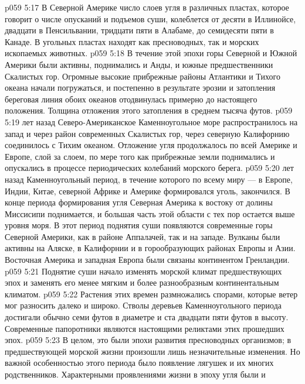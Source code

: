 \vs p059 5:17 В Северной Америке число слоев угля в различных пластах, которое говорит о числе опусканий и подъемов суши, колеблется от десяти в Иллинойсе, двадцати в Пенсильвании, тридцати пяти в Алабаме, до семидесяти пяти в Канаде. В угольных пластах находят как пресноводных, так и морских ископаемых животных.
\vs p059 5:18 В течение этой эпохи горы Северной и Южной Америки были активны, поднимались и Анды, и южные предшественники Скалистых гор. Огромные высокие прибрежные районы Атлантики и Тихого океана начали погружаться, и постепенно в результате эрозии и затопления береговая линия обоих океанов отодвинулась примерно до настоящего положения. Толщина отложения этого затопления в среднем тысяча футов.
\vs p059 5:19 \pc {} лет назад Северо\hyp{}Американское Каменноугольное море распространилось на запад и через район современных Скалистых гор, через северную Калифорнию соединилось с Тихим океаном. Отложение угля продолжалось по всей Америке и Европе, слой за слоем, по мере того как прибрежные земли поднимались и опускались в процессе периодических колебаний морского берега.
\vs p059 5:20 \pc {} лет назад Каменноугольный период, в течение которого по всему миру --- в Европе, Индии, Китае, северной Африке и Америке формировался уголь, закончился. В конце периода формирования угля Северная Америка к востоку от долины Миссисипи поднимается, и большая часть этой области с тех пор остается выше уровня моря. В этот период поднятия суши появляются современные горы Северной Америки, как в районе Аппалачей, так и на западе. Вулканы были активны на Аляске, в Калифорнии и в горообразующих районах Европы и Азии. Восточная Америка и западная Европа были связаны континентом Гренландии.
\vs p059 5:21 Поднятие суши начало изменять морской климат предшествующих эпох и заменять его менее мягким и более разнообразным континентальным климатом.
\vs p059 5:22 Растения этих времен размножались спорами, которые ветер мог разносить далеко и широко. Стволы деревьев Каменноугольного периода достигали обычно семи футов в диаметре и ста двадцати пяти футов в высоту. Современные папоротники являются настоящими реликтами этих прошедших эпох.
\vs p059 5:23 В целом, это были эпохи развития пресноводных организмов; в предшествующей морской жизни произошли лишь незначительные изменения. Но важной особенностью этого периода было  появление лягушек и их многих родственников. Характерными проявлениями жизни в эпоху угля были  и 

